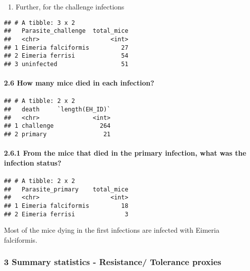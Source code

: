 \documentclass[
]{article}
\providecommand{\tightlist}{%
  \setlength{\itemsep}{0pt}\setlength{\parskip}{0pt}}
\begin{document}
\begin{enumerate}
\def\labelenumi{\arabic{enumi}.}
\setcounter{enumi}{1}
\tightlist
\item
  Further, for the challenge infections
\end{enumerate}

\begin{verbatim}
## # A tibble: 3 x 2
##   Parasite_challenge  total_mice
##   <chr>                    <int>
## 1 Eimeria falciformis         27
## 2 Eimeria ferrisi             54
## 3 uninfected                  51
\end{verbatim}

\hypertarget{how-many-mice-died-in-each-infection}{%
\paragraph{2.6 How many mice died in each
infection?}\label{how-many-mice-died-in-each-infection}}

\begin{verbatim}
## # A tibble: 2 x 2
##   death     `length(EH_ID)`
##   <chr>               <int>
## 1 challenge             264
## 2 primary                21
\end{verbatim}

\hypertarget{from-the-mice-that-died-in-the-primary-infection-what-was-the-infection-status}{%
\paragraph{2.6.1 From the mice that died in the primary infection, what
was the infection
status?}\label{from-the-mice-that-died-in-the-primary-infection-what-was-the-infection-status}}

\begin{verbatim}
## # A tibble: 2 x 2
##   Parasite_primary    total_mice
##   <chr>                    <int>
## 1 Eimeria falciformis         18
## 2 Eimeria ferrisi              3
\end{verbatim}

Most of the mice dying in the first infections are infected with Eimeria
falciformis.

\hypertarget{summary-statistics---resistance-tolerance-proxies}{%
\subsubsection{3 Summary statistics - Resistance/ Tolerance
proxies}\label{summary-statistics---resistance-tolerance-proxies}}
\end{document}
